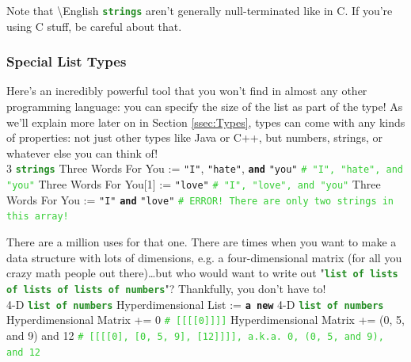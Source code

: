 \documentclass{article}
\newcommand{\English}{\textbackslash{}English}				%
\newcommand{\sssecl}[1]{\subsubsection{#1}\label{sssec:#1}}
\newcommand{\codecomment}[1]{\texttt{\textcolor{LimeGreen}{#1}}}
\newcommand{\commentline}[1]{\codecomment{\# #1}}
\newcommand{\type}[1]{\texttt{\textcolor{ForestGreen}{\textbf{#1}}}}
\newcommand{\common}[1]{\texttt{\textcolor{Mulberry}{\textbf{#1}}}}
\newcommand{\codestring}[1]{\texttt{\textcolor{NavyBlue}{"#1"}}}
\newenvironment{code}[0]
{\ttfamily{}				%
\setlength\parindent{0cm}	%
~\\}
{\setlength\parindent{1cm}
~\\}
\begin{document}
\indent Note that \English{} \type{strings} aren't generally null-terminated like in C. If you're using C stuff, be careful about that.

\sssecl{Special List Types}
\indent Here's an incredibly powerful tool that you won't find in almost any other programming language: you can specify the size of the list as part of the type! As we'll explain more later on in Section \ref{ssec:Types}, types can come with any kinds of properties: not just other types like Java or C++, but numbers, strings, or whatever else you can think of!
\begin{code}
3 \type{strings} Three Words For You := \codestring{I}, \codestring{hate}, \common{and} \codestring{you}	\commentline{"I", "hate", and "you"}
Three Words For You[1] := \codestring{love}	\commentline{"I", "love", and "you"}
Three Words For You := \codestring{I} \common{and} \codestring{love}	\commentline{ERROR! There are only two strings in this array!}
\end{code}

\indent There are a million uses for that one.
\indent There are times when you want to make a data structure with lots of dimensions, e.g. a four-dimensional matrix (for all you crazy math people out there)\ldots{}but who would want to write out "\type{list of lists of lists of lists of numbers}"? Thankfully, you don't have to!
\begin{code}
4-D \type{list of numbers} Hyperdimensional List := \common{a new} 4-D \type{list of numbers}
Hyperdimensional Matrix += 0	\commentline{[[[[0]]]]}
Hyperdimensional Matrix += (0, 5, and 9) and 12	\commentline{[[[[0], [0, 5, 9], [12]]]], a.k.a. 0, (0, 5, and 9), and 12}
\end{code}
\end{document}
